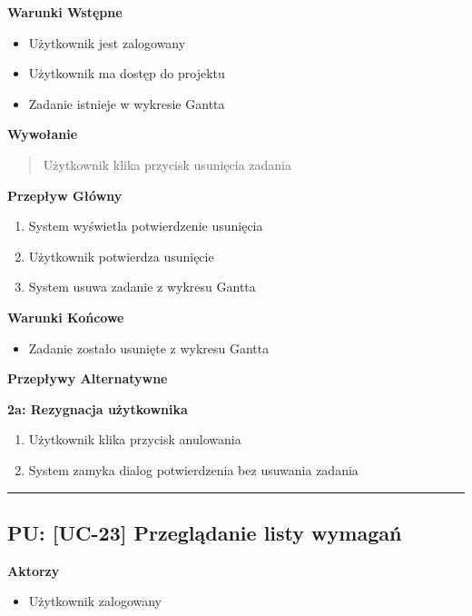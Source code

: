 \vspace{0.2cm}
\noindent\textbf{Warunki Wstępne}
\begin{itemize}
    \item Użytkownik jest zalogowany
    \item Użytkownik ma dostęp do projektu
    \item Zadanie istnieje w wykresie Gantta
\end{itemize}

\vspace{0.2cm}
\noindent\textbf{Wywołanie}
\begin{quote}
    Użytkownik klika przycisk usunięcia zadania
\end{quote}

\vspace{0.2cm}
\noindent\textbf{Przepływ Główny}
\begin{enumerate}
    \item System wyświetla potwierdzenie usunięcia
    \item Użytkownik potwierdza usunięcie
    \item System usuwa zadanie z wykresu Gantta
\end{enumerate}

\vspace{0.2cm}
\noindent\textbf{Warunki Końcowe}
\begin{itemize}
    \item Zadanie zostało usunięte z wykresu Gantta
\end{itemize}

\vspace{0.2cm}
\noindent\textbf{Przepływy Alternatywne}

\textbf{2a: Rezygnacja użytkownika}
\begin{enumerate}
    \item Użytkownik klika przycisk anulowania
    \item System zamyka dialog potwierdzenia bez usuwania zadania
\end{enumerate}


\hrule
\vspace{1cm}

\subsection*{PU: [UC-23] Przeglądanie listy wymagań}

\noindent\textbf{Aktorzy}
\begin{itemize}
    \item Użytkownik zalogowany
\end{itemize}

